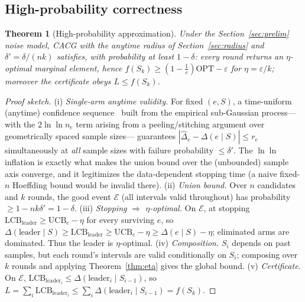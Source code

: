 \documentclass[11pt]{article}
\theoremstyle{plain}
\newtheorem{theorem}{Theorem}
\theoremstyle{definition}
\newcommand{\OPT}{\mathrm{OPT}}
\newcommand{\LCB}{\mathrm{LCB}}
\newcommand{\UCB}{\mathrm{UCB}}
\newcommand{\marg}[2]{\Delta(#1\mid #2)}
\begin{document}
\subsection{High-probability correctness}
\begin{theorem}[High-probability approximation]\label{thm:hp}
Under the Section~\ref{sec:prelim} noise model, CACG with the anytime radius
of Section~\ref{sec:radius} and $\delta'=\delta/(nk)$ satisfies, with
probability at least $1-\delta$: every round returns an $\eta$-optimal
marginal element, hence $f(S_k)\ge(1-\tfrac1e)\OPT-\varepsilon$ for
$\eta=\varepsilon/k$; moreover the certificate obeys $L\le f(S_k)$.
\end{theorem}
\begin{proof}[Proof sketch]
(i) \emph{Single-arm anytime validity.} For fixed $(e,S)$, a time-uniform
(anytime) confidence sequence~\cite{Howard2021} built from the empirical
sub-Gaussian process---with the $2\ln\ln n_e$ term arising from a
peeling/stitching argument over geometrically spaced sample sizes---
guarantees $|\widehat\Delta_e-\marg{e}{S}|\le r_e$ simultaneously at
\emph{all} sample sizes with failure probability $\le\delta'$. The $\ln\ln$
inflation is exactly what makes the union bound over the (unbounded) sample
axis converge, and it legitimizes the data-dependent stopping time (a naive
fixed-$n$ Hoeffding bound would be invalid there).
(ii) \emph{Union bound.} Over $n$ candidates and $k$ rounds, the good event
$\mathcal E$ (all intervals valid throughout) has probability
$\ge 1-nk\delta'=1-\delta$.
(iii) \emph{Stopping $\Rightarrow$ $\eta$-optimal.} On $\mathcal E$, at
stopping $\LCB_{\text{leader}}\ge\UCB_e-\eta$ for every surviving $e$, so
$\marg{\text{leader}}{S}\ge\LCB_{\text{leader}}\ge\UCB_e-\eta\ge\marg{e}{S}-\eta$;
eliminated arms are dominated. Thus the leader is $\eta$-optimal.
(iv) \emph{Composition.} $S_i$ depends on past samples, but each round's
intervals are valid conditionally on $S_i$; composing over $k$ rounds and
applying Theorem~\ref{thm:eta} gives the global bound.
(v) \emph{Certificate.} On $\mathcal E$,
$\LCB_{\text{leader}_i}\le\marg{\text{leader}_i}{S_{i-1}}$, so
$L=\sum_i\LCB_{\text{leader}_i}\le\sum_i\marg{\text{leader}_i}{S_{i-1}}=f(S_k)$.
\end{proof}
\end{document}
